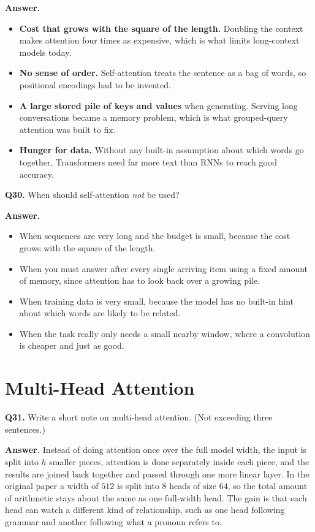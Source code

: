 \documentclass[11pt]{article}
\begin{document}
\textbf{Answer.}
\begin{itemize}
  \item \textbf{Cost that grows with the square of the length.} Doubling the context makes attention four times as expensive, which is what limits long-context models today.
  \item \textbf{No sense of order.} Self-attention treats the sentence as a bag of words, so positional encodings had to be invented.
  \item \textbf{A large stored pile of keys and values} when generating. Serving long conversations became a memory problem, which is what grouped-query attention was built to fix.
  \item \textbf{Hunger for data.} Without any built-in assumption about which words go together, Transformers need far more text than RNNs to reach good accuracy.
\end{itemize}

\medskip
\textbf{Q30.} When should self-attention \emph{not} be used?

\textbf{Answer.}
\begin{itemize}
  \item When sequences are very long and the budget is small, because the cost grows with the square of the length.
  \item When you must answer after every single arriving item using a fixed amount of memory, since attention has to look back over a growing pile.
  \item When training data is very small, because the model has no built-in hint about which words are likely to be related.
  \item When the task really only needs a small nearby window, where a convolution is cheaper and just as good.
\end{itemize}

\section{Multi-Head Attention}

\textbf{Q31.} Write a short note on multi-head attention. (Not exceeding three sentences.)

\textbf{Answer.} Instead of doing attention once over the full model width, the input is split
into $h$ smaller pieces, attention is done separately inside each piece, and the results are
joined back together and passed through one more linear layer. In the original paper a width
of $512$ is split into $8$ heads of size $64$, so the total amount of arithmetic stays about
the same as one full-width head. The gain is that each head can watch a different kind of
relationship, such as one head following grammar and another following what a pronoun refers
to.
\end{document}
